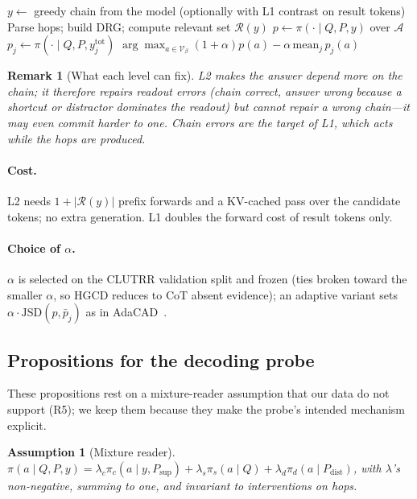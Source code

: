 \documentclass[11pt]{article}
\newtheorem{assumption}{Assumption}
\newtheorem{remark}{Remark}
\newcommand{\pa}{\pi}
\newcommand{\dotot}[1]{y^{\mathrm{tot}}_{#1}}
\newcommand{\Rel}{\mathcal{R}}
\newcommand{\hgcd}{\textsc{HGCD}}
\begin{document}
\begin{algorithm}[t]
\caption{\hgcd{} (L2) for one question}
\label{alg:hgcd}
\begin{algorithmic}[1]
\State $y\gets$ greedy chain from the model (optionally with L1 contrast on result tokens)
\State Parse hops; build DRG; compute relevant set $\Rel(y)$
\State $p\gets\pa(\cdot\mid Q,P,y)$ over $\mathcal{A}$ 
\For{$j\in\Rel(y)$} \State $p_j\gets\pa(\cdot\mid Q,P,\dotot{j})$ \EndFor
\State \Return $\arg\max_{a\in\mathcal{V}_\beta}(1+\alpha)p(a)-\alpha\,\mathrm{mean}_j\,p_j(a)$
\end{algorithmic}
\end{algorithm}

\begin{remark}[What each level can fix]
L2 makes the answer depend \emph{more} on the chain; it therefore repairs \emph{readout} errors
(chain correct, answer wrong because a shortcut or distractor dominates the readout) but cannot
repair a wrong chain---it may even commit harder to one. Chain errors are the target of L1, which
acts while the hops are produced. 
\end{remark}

\paragraph{Cost.} L2 needs $1+|\Rel(y)|$ prefix forwards and a KV-cached pass over the candidate
tokens; no extra generation. L1 doubles the forward cost of result tokens only.
\paragraph{Choice of $\alpha$.} $\alpha$ is selected on the CLUTRR validation split and frozen
(ties broken toward the smaller $\alpha$, so \hgcd{} reduces to CoT absent evidence); an
adaptive variant sets $\alpha\cdot\mathrm{JSD}(p,\bar p_j)$ as in AdaCAD~\citep{wang2025adacad}.

\subsection*{Propositions for the decoding probe}
These propositions rest on a mixture-reader assumption that our data do not support (R5); we keep
them because they make the probe's intended mechanism explicit.

\begin{assumption}[Mixture reader]\label{as:mixture}
$\pa(a\mid Q,P,y)=\lambda_c\pa_c(a\mid y,P_{\mathrm{sup}})+\lambda_s\pa_s(a\mid Q)+
\lambda_d\pa_d(a\mid P_{\mathrm{dist}})$, with $\lambda$'s non-negative, summing to one, and
invariant to interventions on hops.
\end{assumption}
\end{document}
